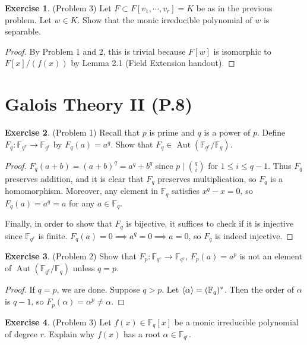 \documentclass[12pt, psamsfonts]{amsart}
\theoremstyle{definition}
\newtheorem*{exer}{Exercise}
\theoremstyle{remark}
\DeclareMathOperator{\Aut}{Aut}
\numberwithin{equation}{section}
\begin{document}
\begin{exer}{(Problem 3)}
  Let $F \subset F[v_1, \cdots, v_r] = K$ be as in the previous problem.
  Let $w \in K$.
  Show that the monic irreducible polynomial of $w$ is separable.
\end{exer}

\begin{proof}
  By Problem 1 and 2, this is trivial because $F[w]$ is isomorphic to $F[x]/(f(x))$ by Lemma 2.1 (Field Extension handout).
\end{proof}

\section{Galois Theory II (P.8)}

\begin{exer}{(Problem 1)}
  Recall that $p$ is prime and $q$ is a power of $p$.
  Define $F_q: \mathbb{F}_{q^r} \rightarrow \mathbb{F}_{q^r}$ by $F_q(a) = a^q$.
  Show that $F_q \in \Aut(\mathbb{F}_{q^r}/\mathbb{F}_q)$.
\end{exer}

\begin{proof}
  $F_q(a + b) = (a + b)^q = a^q + b^q$ since $p \mid \binom{q}{i}$ for $1 \leq i \leq q - 1$.
  Thus $F_q$ preserves addition, and it is clear that $F_q$ preserves multiplication, so $F_q$ is a homomorphism.
  Moreover, any element in $\mathbb{F}_q$ satisfies $x^q - x = 0$, so $F_q(a) = a^q = a$ for any $a \in \mathbb{F}_q$.

  Finally, in order to show that $F_q$ is bijective, it suffices to check if it is injective since $\mathbb{F}_{q^r}$ is finite.
  $F_q(a) = 0 \implies a^q = 0 \implies a = 0$, so $F_q$ is indeed injective.
\end{proof}

\begin{exer}{(Problem 2)}
  Show that $F_p: \mathbb{F}_{q^r} \rightarrow \mathbb{F}_{q^r}$, $F_p(a) = a^p$ is not an element of $\Aut(\mathbb{F}_{q^r} / \mathbb{F}_q)$ unless $q = p$.
\end{exer}

\begin{proof}
  If $q = p$, we are done.
  Suppose $q > p$.
  Let $\ev{\alpha} = (\mathbb{F}_{q})^{*}$.
  Then the order of $\alpha$ is $q - 1$, so $F_p(\alpha) = \alpha^p \ne \alpha$.
\end{proof}

\begin{exer}{(Problem 3)}
  Let $f(x) \in \mathbb{F}_q[x]$ be a monic irreducible polynomial of degree $r$.
  Explain why $f(x)$ has a root $\alpha \in \mathbb{F}_{q^r}$.
\end{exer}
\end{document}
